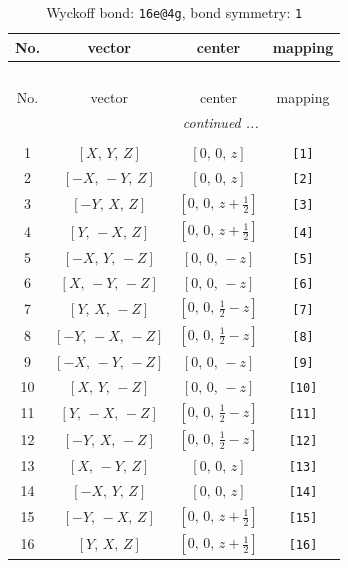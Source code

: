 \documentclass[fleqn,8pt]{jsarticle}
\begin{document}
\begin{longtable}{cccc}
\caption{Wyckoff bond: {\tt 16e@4g}, bond symmetry: {\tt 1}}
 \\
 \hline \hline
No. & vector & center & mapping \\ \hline \endfirsthead

\multicolumn{3}{l}{\tablename\ \thetable{}} \\
 \hline \hline
No. & vector & center & mapping \\ \hline \endhead

 \hline \hline
\multicolumn{3}{r}{\footnotesize\it continued ...} \\ \endfoot

 \hline \hline
\multicolumn{3}{r}{} \\ \endlastfoot

1 & $\left[ X,\, Y,\, Z \right]$ & $\left[ 0,\, 0,\, z \right]$ & {\tt [1]} \\ \hline
2 & $\left[ - X,\, - Y,\, Z \right]$ & $\left[ 0,\, 0,\, z \right]$ & {\tt [2]} \\ \hline
3 & $\left[ - Y,\, X,\, Z \right]$ & $\left[ 0,\, 0,\, z + \frac{1}{2} \right]$ & {\tt [3]} \\ \hline
4 & $\left[ Y,\, - X,\, Z \right]$ & $\left[ 0,\, 0,\, z + \frac{1}{2} \right]$ & {\tt [4]} \\ \hline
5 & $\left[ - X,\, Y,\, - Z \right]$ & $\left[ 0,\, 0,\, - z \right]$ & {\tt [5]} \\ \hline
6 & $\left[ X,\, - Y,\, - Z \right]$ & $\left[ 0,\, 0,\, - z \right]$ & {\tt [6]} \\ \hline
7 & $\left[ Y,\, X,\, - Z \right]$ & $\left[ 0,\, 0,\, \frac{1}{2} - z \right]$ & {\tt [7]} \\ \hline
8 & $\left[ - Y,\, - X,\, - Z \right]$ & $\left[ 0,\, 0,\, \frac{1}{2} - z \right]$ & {\tt [8]} \\ \hline
9 & $\left[ - X,\, - Y,\, - Z \right]$ & $\left[ 0,\, 0,\, - z \right]$ & {\tt [9]} \\ \hline
10 & $\left[ X,\, Y,\, - Z \right]$ & $\left[ 0,\, 0,\, - z \right]$ & {\tt [10]} \\ \hline
11 & $\left[ Y,\, - X,\, - Z \right]$ & $\left[ 0,\, 0,\, \frac{1}{2} - z \right]$ & {\tt [11]} \\ \hline
12 & $\left[ - Y,\, X,\, - Z \right]$ & $\left[ 0,\, 0,\, \frac{1}{2} - z \right]$ & {\tt [12]} \\ \hline
13 & $\left[ X,\, - Y,\, Z \right]$ & $\left[ 0,\, 0,\, z \right]$ & {\tt [13]} \\ \hline
14 & $\left[ - X,\, Y,\, Z \right]$ & $\left[ 0,\, 0,\, z \right]$ & {\tt [14]} \\ \hline
15 & $\left[ - Y,\, - X,\, Z \right]$ & $\left[ 0,\, 0,\, z + \frac{1}{2} \right]$ & {\tt [15]} \\ \hline
16 & $\left[ Y,\, X,\, Z \right]$ & $\left[ 0,\, 0,\, z + \frac{1}{2} \right]$ & {\tt [16]} \\
\end{longtable}
\end{document}
